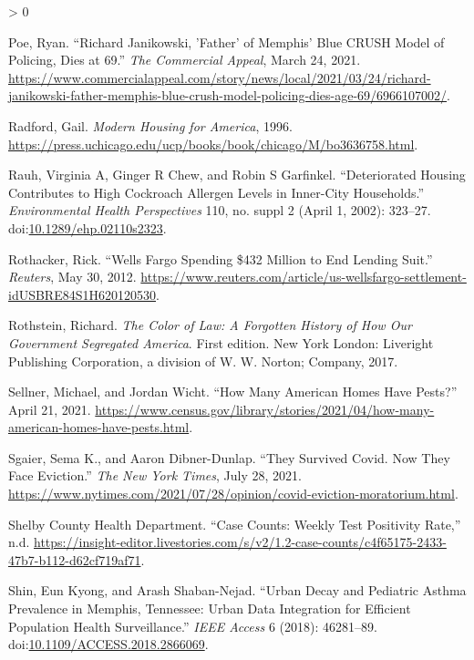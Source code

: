 \documentclass[
  openany]{book}
\newlength{\cslhangindent}
\newenvironment{CSLReferences}[2] %
 {%
  \setlength{\parindent}{0pt}
  \ifodd #1 \everypar{\setlength{\hangindent}{\cslhangindent}}\ignorespaces\fi
  \ifnum #2 > 0
  \setlength{\parskip}{#2\baselineskip}
  \fi
 }%
 {}
\begin{document}
\begin{CSLReferences}{1}{0}
\leavevmode\hypertarget{ref-poe2021}{}%
Poe, Ryan. {``Richard Janikowski, 'Father' of Memphis' Blue CRUSH Model of Policing, Dies at 69.''} \emph{The Commercial Appeal}, March 24, 2021. \url{https://www.commercialappeal.com/story/news/local/2021/03/24/richard-janikowski-father-memphis-blue-crush-model-policing-dies-age-69/6966107002/}.

\leavevmode\hypertarget{ref-radford1996}{}%
Radford, Gail. \emph{Modern Housing for America}, 1996. \url{https://press.uchicago.edu/ucp/books/book/chicago/M/bo3636758.html}.

\leavevmode\hypertarget{ref-rauh2002}{}%
Rauh, Virginia A, Ginger R Chew, and Robin S Garfinkel. {``Deteriorated Housing Contributes to High Cockroach Allergen Levels in Inner-City Households.''} \emph{Environmental Health Perspectives} 110, no. suppl 2 (April 1, 2002): 323--27. doi:\href{https://doi.org/10.1289/ehp.02110s2323}{10.1289/ehp.02110s2323}.

\leavevmode\hypertarget{ref-rothacker2012}{}%
Rothacker, Rick. {``Wells Fargo Spending {\$}432 Million to End Lending Suit.''} \emph{Reuters}, May 30, 2012. \url{https://www.reuters.com/article/us-wellsfargo-settlement-idUSBRE84S1H620120530}.

\leavevmode\hypertarget{ref-rothstein2017}{}%
Rothstein, Richard. \emph{The Color of Law: A Forgotten History of How Our Government Segregated America}. First edition. New York London: Liveright Publishing Corporation, a division of W. W. Norton; Company, 2017.

\leavevmode\hypertarget{ref-sellner2021}{}%
Sellner, Michael, and Jordan Wicht. {``How Many American Homes Have Pests?''} April 21, 2021. \url{https://www.census.gov/library/stories/2021/04/how-many-american-homes-have-pests.html}.

\leavevmode\hypertarget{ref-sgaier2021}{}%
Sgaier, Sema K., and Aaron Dibner-Dunlap. {``They Survived Covid. Now They Face Eviction.''} \emph{The New York Times}, July 28, 2021. \url{https://www.nytimes.com/2021/07/28/opinion/covid-eviction-moratorium.html}.

\leavevmode\hypertarget{ref-shelbycountyhealthdepartment}{}%
Shelby County Health Department. {``Case Counts: Weekly Test Positivity Rate,''} n.d. \url{https://insight-editor.livestories.com/s/v2/1.2-case-counts/c4f65175-2433-47b7-b112-d62cf719af71}.

\leavevmode\hypertarget{ref-shin2018}{}%
Shin, Eun Kyong, and Arash Shaban-Nejad. {``Urban Decay and Pediatric Asthma Prevalence in Memphis, Tennessee: Urban Data Integration for Efficient Population Health Surveillance.''} \emph{IEEE Access} 6 (2018): 46281--89. doi:\href{https://doi.org/10.1109/ACCESS.2018.2866069}{10.1109/ACCESS.2018.2866069}.


\end{CSLReferences}
\end{document}
